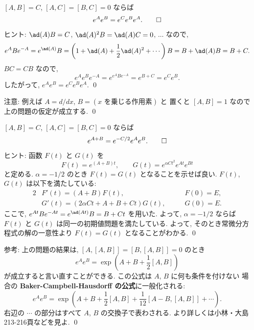 \documentclass[12pt,twoside]{jarticle}
\begin{document}

\begin{question}
  $[A,B] = C$, $[A,C]=[B,C]=0$ ならば
  \begin{equation*}
    e^A e^B = e^C e^B e^A.
    \qed
  \end{equation*}
\end{question}

\noindent 
ヒント: $\ad(A)B=C$, $\ad(A)^2B=\ad(A)C=0$, $\ldots$ なので,
\begin{equation*}
  e^A B e^{-A}
  = e^{\ad(A)}B
  = \left(1 + \ad(A) + \frac{1}{2}\ad(A)^2 + \cdots \right) B
  = B + \ad(A)B = B + C.
\end{equation*}
$BC = CB$ なので,
\begin{equation*}
  e^A e^B e^{-A} = e^{e^A B e^{-A}} = e^{B+C} = e^C e^B.
\end{equation*}
したがって, $e^Ae^B = e^Ce^Be^A$. \qed

\medskip

\noindent 
注意: 例えば $A=d/dx$, $B=(\text{$x$ を乗じる作用素})$ と
置くと $[A,B]=1$ なので上の問題の仮定が成立する.
\qed


\begin{question}
  $[A,B]=C$, $[A,C]=[B,C]=0$ ならば
  \begin{equation*}
    e^{A+B} = e^{-C/2} e^A e^B.
    \qed
  \end{equation*}
\end{question}

\noindent
ヒント: 函数 $F(t)$ と $G(t)$ を
\begin{equation*}
  F(t) = e^{(A+B)t}, \qquad G(t) = e^{\alpha Ct^2} e^{At} e^{Bt}
\end{equation*}
と定める. $\alpha=-1/2$ のとき $F(t)=G(t)$ となることを示せば良い.
$F(t)$, $G(t)$ は以下を満たしている:
\begin{alignat*}{2}
  & F'(t) = (A+B) F(t), \qquad & F(0) = E, \\
  & G'(t) = (2\alpha Ct + A + B + Ct)G(t), \qquad & G(0) = E.
\end{alignat*}
ここで, $e^{At}Be^{-At}=e^{\ad(At)}B=B+Ct$ を用いた. よって,
$\alpha=-1/2$ ならば $F(t)$ と $G(t)$ は同一の初期値問題を満たしている.
よって, そのとき常微分方程式の解の一意性より $F(t)=G(t)$ となることがわかる.
\qed 

\medskip
\noindent
参考: 上の問題の結果は, $[A,[A,B]]=[B,[A,B]]=0$ のとき
\begin{equation*}
  e^A e^B = \exp\left(A+B+\frac{1}{2}[A,B]\right)
\end{equation*}
が成立すると言い直すことができる.  この公式は $A$, $B$ に何も条件を付けない
場合の {\bf Baker-Campbell-Hausdorff の公式}に一般化される:
\begin{equation*}
  e^A e^B 
  = \exp\left(A+B+\frac{1}{2}[A,B]+\frac{1}{12}[A-B,[A,B]]+\cdots\right).
\end{equation*}
右辺の $\cdots$ の部分はすべて $A$, $B$ の交換子で表わされる.
より詳しくは小林・大島 \cite{KO} 213-216頁などを見よ.
\qed
\end{document}
